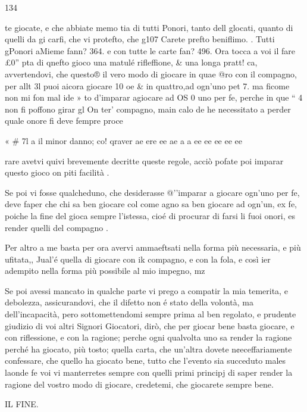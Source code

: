 \documentclass[11pt,a6paper]{article}
\begin{document}
 

134

te giocate, e che abbiate memo
tia di tutti Ponori, tanto dell
glocati, quanto di quelli da gi
carfi, che vi protefto, che g107
Carete prefto beniflimo. .
Tutti gPonori aMieme fann?
364. e con tutte le carte fan?
496. Ora tocca a voi il fare £0”
pta di qnefto gioco una matulé
rifleffione, & una longa pratt!
ca, avvertendovi, che questo®
il vero modo di giocare in quae
@ro con il compagno, per allt
3l puoi aicora giocare 10 oe
& in quattro,ad ogn’uno pet 7.
ma ficome non mi fon mal ide »
to d’imparar agiocare ad OS 0
uno per fe, perche in que “ 4
non fi poffono girar gl On ter’
compagno, main calo de he
necessitato a perder quale
onore fi deve fempre proce

« # 7l a
il minor danno; co! qraver
ae ere ee ae a a ee ee ee ee ee

rare
avetvi quivi brevemente decritte queste regole, acciò pofate poi imparar questo gioco
on piti facilità .

Se poi vi fosse qualcheduno,
che desiderasse @’'imparar a giocare ogn’uno per fe, deve faper
che chi sa ben giocare col come
agno sa ben giocare ad ogn’un,
ex fe, poiche la fine del gioca
sempre l'istessa, cioé di procurar di
farsi li fuoi onori, es
render quelli del compagno .

 Per altro a me basta per ora
avervi ammaeftsati nella forma
più necessaria, e più ufitata,,
Jual’é quella di giocare con ik 
compagno, e con la fola, e così
ier adempito nella forma più
possibile al mio impegno, mz

Se poi avessi mancato in qualche 
parte vi prego a compatir la 
mia temerita, e debolezza,
assicurandovi, che il difetto non é
stato della volontà, ma dell'incapacità,
pero sottomettendomi
sempre prima al ben regolato,
e prudente giudizio di voi
altri Signori Giocatori, dirò,
che per giocar bene basta giocare, e con riflessione, e con la
ragione; perche ogni qualvolta
uno sa render la ragione perché
ha giocato, più tosto; quella
carta, che un’altra dovete n¢eceffariamente
confessare, che
quello ha giocato bene, tutto
che l’evento sia succeduto males
laonde fe voi vi manterretes
sempre con quelli primi principj
di saper render la ragione del
vostro modo di giocare, credetemi,
che giocarete sempre bene.

IL FINE.
\end{document}
